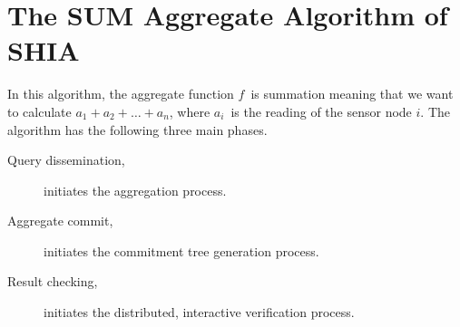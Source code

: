 \section{The SUM Aggregate Algorithm of SHIA}
	In this algorithm, the aggregate function $f$\ is summation meaning that we want to calculate $a_{1} + a_{2} + \dotsc + a_{n}$, where $a_{i}$\ is the reading of the sensor node $i$.
	The algorithm has the following three main phases.
	\begin{description}
		\item [Query dissemination,] initiates the aggregation process.
		\item [Aggregate commit,] initiates the commitment tree generation process.
		\item [Result checking,] initiates the distributed, interactive verification process.
	\end{description}

